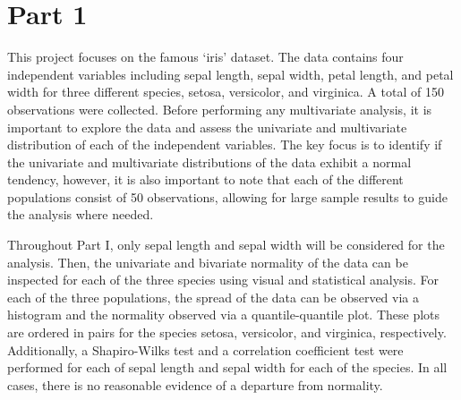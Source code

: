 


\maketitle

\section*{Part 1} 
	This project focuses on the famous `iris' dataset. The data contains four independent variables including sepal length, sepal width, petal length, and petal width for three different species, setosa, versicolor, and virginica. A total of 150 observations were collected. Before performing any multivariate analysis, it is important to explore the data and assess the univariate and multivariate distribution of each of the independent variables. The key focus is to identify if the univariate and multivariate distributions of the data exhibit a normal tendency, however, it is also important to note that each of the different populations consist of 50 observations, allowing for large sample results to guide the analysis where needed.

Throughout Part I, only sepal length and sepal width will be considered for the analysis. Then, the univariate and bivariate normality of the data can be inspected for each of the three species using visual and statistical analysis. For each of the three populations, the spread of the data can be observed via a histogram and the normality observed via a quantile-quantile plot. These plots are ordered in pairs for the species setosa, versicolor, and virginica, respectively. Additionally, a Shapiro-Wilks test and a correlation coefficient test were performed for each of sepal length and sepal width for each of the species. In all cases, there is no reasonable evidence of a departure from normality.

